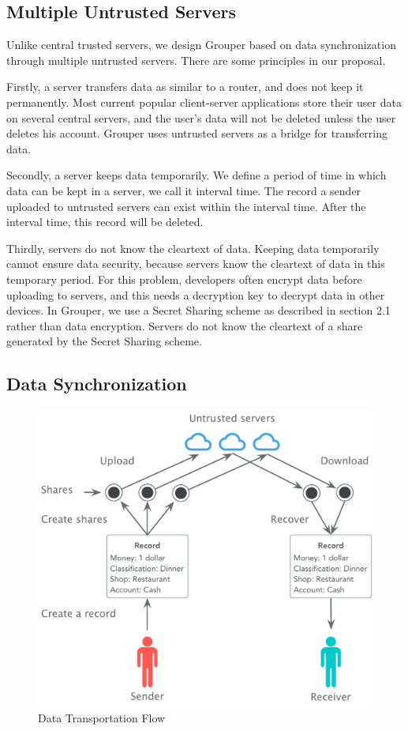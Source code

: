 \documentclass[twocolumn,10pt]{article}
\begin{document}
\subsection{Multiple Untrusted Servers}

Unlike central trusted servers, we design Grouper based on data synchronization through multiple untrusted servers. There are some principles in our proposal. 

Firstly, a server transfers data as similar to a router, and does not keep it permanently. Most current popular client-server applications store their user data on several central servers, and the user's data will not be deleted unless the user deletes his account. Grouper uses untrusted servers as a bridge for transferring data.

Secondly, a server keeps data temporarily. We define a period of time in which data can be kept in a server, we call it interval time. The record a sender uploaded to untrusted servers can exist within the interval time. After the interval time, this record will be deleted.

Thirdly, servers do not know the cleartext of data. Keeping data temporarily cannot ensure data security, because servers know the cleartext of data in this temporary period. For this problem, developers often encrypt data before uploading to servers, and this needs a decryption key to decrypt data in other devices. In Grouper, we use a Secret Sharing scheme as described in section 2.1 rather than data encryption. Servers do not know the cleartext of a share generated by the Secret Sharing scheme.

\subsection{Data Synchronization}

\begin{figure}[t]
	\centering
	\includegraphics[scale=0.38]{sync_flow}
	\caption{Data Transportation Flow}
\end{figure}
\end{document}
